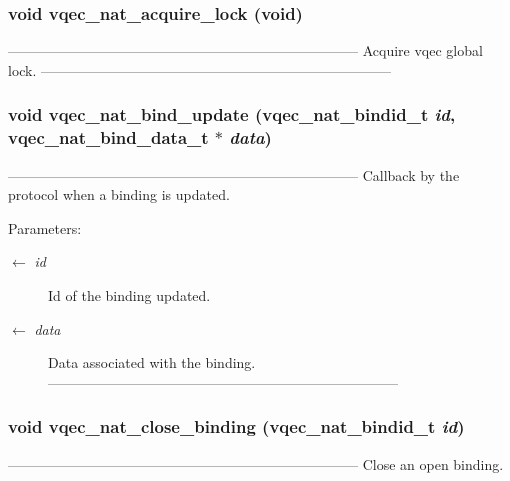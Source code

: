 \subsubsection{\setlength{\rightskip}{0pt plus 5cm}void vqec\_\-nat\_\-acquire\_\-lock (void)}\label{vqec__nat__api_8c_5422862de25da395b7a61b47f0502fce}


--------------------------------------------------------------------------- Acquire vqec global lock. --------------------------------------------------------------------------- 
\subsubsection{\setlength{\rightskip}{0pt plus 5cm}void vqec\_\-nat\_\-bind\_\-update (vqec\_\-nat\_\-bindid\_\-t {\em id}, vqec\_\-nat\_\-bind\_\-data\_\-t $\ast$ {\em data})}\label{vqec__nat__api_8c_dcac0556e012248edc0b846b395b1e8d}


--------------------------------------------------------------------------- Callback by the protocol when a binding is updated.

\begin{Desc}
\item[Parameters:]
\begin{description}
\item[\mbox{$\leftarrow$} {\em id}]Id of the binding updated. \item[\mbox{$\leftarrow$} {\em data}]Data associated with the binding. --------------------------------------------------------------------------- \end{description}
\end{Desc}
\subsubsection{\setlength{\rightskip}{0pt plus 5cm}void vqec\_\-nat\_\-close\_\-binding (vqec\_\-nat\_\-bindid\_\-t {\em id})}\label{vqec__nat__api_8c_cdca6fc3afa0147f86504eaaf531ca89}


--------------------------------------------------------------------------- Close an open binding.

